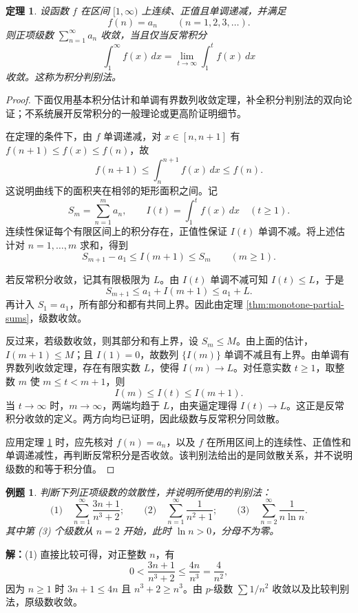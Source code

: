 \documentclass[UTF8,fontset=fandol,11pt]{ctexart}
\newtheorem{theorem}[definition]{定理}
\newtheorem{example}[definition]{例题}
\begin{document}
\begin{theorem}
设函数 $f$ 在区间 $[1,\infty)$ 上连续、正值且单调递减，并满足
\[
f(n)=a_n\qquad(n=1,2,3,\ldots).
\]
则正项级数 $\sum_{n=1}^{\infty}a_n$ 收敛，当且仅当反常积分
\[
\int_{1}^{\infty}f(x)\,dx
=\lim_{t\to\infty}\int_{1}^{t}f(x)\,dx
\]
收敛。这称为积分判别法。\label{thm:integral-test}
\end{theorem}
\begin{proof}
下面仅用基本积分估计和单调有界数列收敛定理，补全积分判别法的双向论证；不系统展开反常积分的一般理论或更高阶证明细节。

在定理的条件下，由 $f$ 单调递减，对 $x\in[n,n+1]$ 有 $f(n+1)\leq f(x)\leq f(n)$，故
\[
f(n+1)\leq\int_n^{n+1}f(x)\,dx\leq f(n).
\]
这说明曲线下的面积夹在相邻的矩形面积之间。记
\[
S_m=\sum_{n=1}^{m}a_n,\qquad I(t)=\int_1^t f(x)\,dx\quad(t\geq1).
\]
连续性保证每个有限区间上的积分存在，正值性保证 $I(t)$ 单调不减。将上述估计对 $n=1,\ldots,m$ 求和，得到
\[
S_{m+1}-a_1\leq I(m+1)\leq S_m\qquad(m\geq1).
\]

若反常积分收敛，记其有限极限为 $L$。由 $I(t)$ 单调不减可知 $I(t)\leq L$，于是
\[
S_{m+1}\leq a_1+I(m+1)\leq a_1+L.
\]
再计入 $S_1=a_1$，所有部分和都有共同上界。因此由定理 \ref{thm:monotone-partial-sums}，级数收敛。

反过来，若级数收敛，则其部分和有上界，设 $S_m\leq M$。由上面的估计，$I(m+1)\leq M$；且 $I(1)=0$，故数列 $\{I(m)\}$ 单调不减且有上界。由单调有界数列收敛定理，存在有限实数 $L$，使得 $I(m)\to L$。对任意实数 $t\geq1$，取整数 $m$ 使 $m\leq t<m+1$，则
\[
I(m)\leq I(t)\leq I(m+1).
\]
当 $t\to\infty$ 时，$m\to\infty$，两端均趋于 $L$，由夹逼定理得 $I(t)\to L$。这正是反常积分收敛的定义。两方向均已证明，因此级数与反常积分同敛散。

应用定理 \ref{thm:integral-test} 时，应先核对 $f(n)=a_n$，以及 $f$ 在所用区间上的连续性、正值性和单调递减性，再判断反常积分是否收敛。该判别法给出的是同敛散关系，并不说明级数的和等于积分值。
\end{proof}
\begin{example}
判断下列正项级数的敛散性，并说明所使用的判别法：
\[
\text{(1)}\quad\sum_{n=1}^{\infty}\frac{3n+1}{n^3+2};
\qquad
\text{(2)}\quad\sum_{n=1}^{\infty}\frac{1}{n^2+1};
\qquad
\text{(3)}\quad\sum_{n=2}^{\infty}\frac{1}{n\ln n}.
\]
其中第 (3) 个级数从 $n=2$ 开始，此时 $\ln n>0$，分母不为零。
\end{example}
\par\noindent\textbf{解：}(1) 直接比较可得，对正整数 $n$，有
\[
0<\frac{3n+1}{n^3+2}\leq\frac{4n}{n^3}=\frac{4}{n^2},
\]
因为 $n\geq1$ 时 $3n+1\leq4n$ 且 $n^3+2\geq n^3$。由 $p$-级数 $\sum 1/n^2$ 收敛以及比较判别法，原级数收敛。
\end{document}
